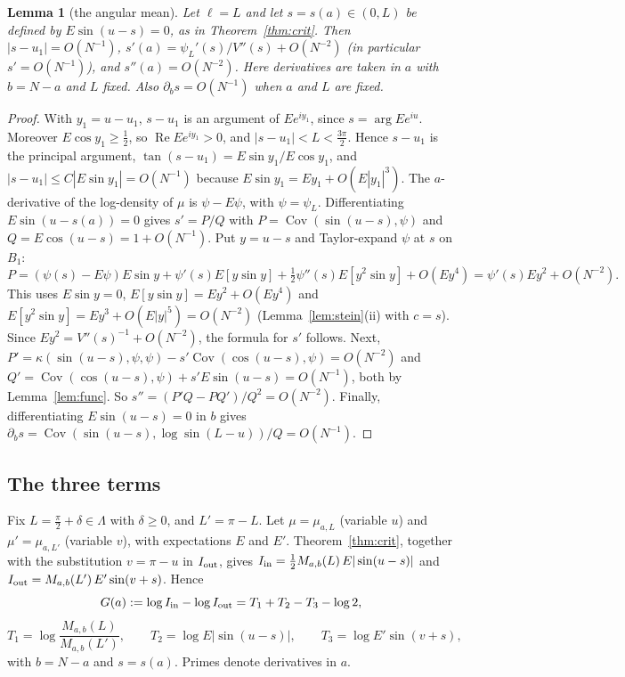 \documentclass[11pt]{amsart}
\newtheorem{lemma}[theorem]{Lemma}
\theoremstyle{definition}
\begin{document}
\begin{lemma}[the angular mean]\label{lem:s}
Let $\ell=L$ and let $s=s(a)\in(0,L)$ be defined by $E\sin(u-s)=0$, as in Theorem~\ref{thm:crit}. Then $|s-u_1|=O(N^{-1})$, $s'(a)=\psi_L'(s)/V''(s)+O(N^{-2})$ (in particular
$s'=O(N^{-1})$), and $s''(a)=O(N^{-2})$. Here derivatives are taken in $a$ with $b=N-a$ and $L$ fixed. Also $\partial_bs=O(N^{-1})$ when $a$ and $L$ are fixed.
\end{lemma}
\begin{proof}
With $y_1=u-u_1$, $s-u_1$ is an argument of $Ee^{iy_1}$, since $s=\arg Ee^{iu}$. Moreover $E\cos y_1\ge\frac12$, so $\operatorname{Re}Ee^{iy_1}>0$, and $|s-u_1|<L<\frac{3\pi}2$.
Hence $s-u_1$ is the principal argument, $\tan(s-u_1)=E\sin y_1/E\cos y_1$, and $|s-u_1|\le C|E\sin y_1|=O(N^{-1})$ because $E\sin y_1=Ey_1+O(E|y_1|^3)$.
The $a$-derivative of the log-density of $\mu$ is $\psi-E\psi$, with $\psi=\psi_L$. Differentiating $E\sin(u-s(a))=0$ gives $s'=P/Q$ with
$P=\operatorname{Cov}(\sin(u-s),\psi)$ and $Q=E\cos(u-s)=1+O(N^{-1})$. Put $y=u-s$ and Taylor-expand $\psi$ at $s$ on $B_1$:
\[
P=(\psi(s)-E\psi)E\sin y+\psi'(s)E[y\sin y]+\tfrac12\psi''(s)E[y^2\sin y]+O(Ey^4)=\psi'(s)Ey^2+O(N^{-2}).
\]
This uses $E\sin y=0$, $E[y\sin y]=Ey^2+O(Ey^4)$ and $E[y^2\sin y]=Ey^3+O(E|y|^5)=O(N^{-2})$ (Lemma~\ref{lem:stein}(ii) with $c=s$). Since $Ey^2=V''(s)^{-1}+O(N^{-2})$,
the formula for $s'$ follows. Next, $P'=\kappa(\sin(u-s),\psi,\psi)-s'\operatorname{Cov}(\cos(u-s),\psi)=O(N^{-2})$ and
$Q'=\operatorname{Cov}(\cos(u-s),\psi)+s'E\sin(u-s)=O(N^{-1})$, both by Lemma~\ref{lem:func}. So $s''=(P'Q-PQ')/Q^2=O(N^{-2})$.
Finally, differentiating $E\sin(u-s)=0$ in $b$ gives $\partial_bs=\operatorname{Cov}(\sin(u-s),\log\sin(L-u))/Q=O(N^{-1})$.
\end{proof}

\subsection*{The three terms}
Fix $L=\frac\pi2+\delta\in\Lambda$ with $\delta\ge0$, and $L'=\pi-L$. Let $\mu=\mu_{a,L}$ (variable $u$) and $\mu'=\mu_{a,L'}$ (variable $v$), with
expectations $E$ and $E'$. Theorem~\ref{thm:crit}, together with the substitution $v=\pi-u$ in $I_{\rm out}$, gives $I_{\rm in}=\frac12M_{a,b}(L)\,E|\sin(u-s)|$ and
$I_{\rm out}=M_{a,b}(L')\,E'\sin(v+s)$. Hence
\[
G(a):=\log I_{\rm in}-\log I_{\rm out}=T_1+T_2-T_3-\log2,
\]
\[
T_1=\log\frac{M_{a,b}(L)}{M_{a,b}(L')},\qquad T_2=\log E|\sin(u-s)|,\qquad T_3=\log E'\sin(v+s),
\]
with $b=N-a$ and $s=s(a)$. Primes denote derivatives in $a$.
\end{document}
